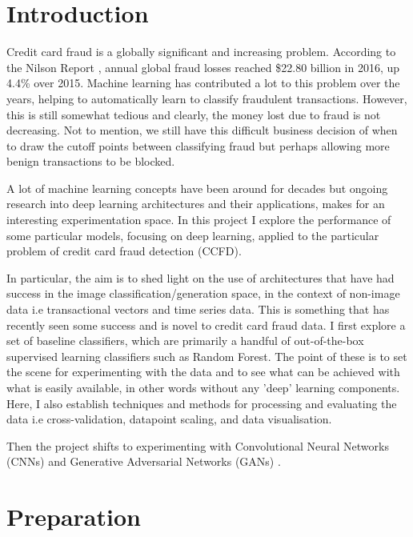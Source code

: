 \documentclass[12pt,a4paper,twoside]{report}
\begin{document}
\tableofcontents

\pagestyle{headings} 

\chapter{Introduction}

Credit card fraud is a globally significant and increasing problem. According to the Nilson Report \cite{nilsonreport}, annual global fraud losses reached \$22.80 billion in 2016, up 4.4\% over 2015. Machine learning has contributed a lot to this problem over the years, helping to automatically learn to classify fraudulent transactions. However, this is still somewhat tedious and clearly, the money lost due to fraud is not decreasing. Not to mention, we still have this difficult business decision of when to draw the cutoff points between classifying fraud but perhaps allowing more benign transactions to be blocked.

A lot of machine learning concepts have been around for decades but ongoing research into deep learning architectures and their applications, makes for an interesting experimentation space. In this project I explore the performance of some particular models, focusing on deep learning, applied to the particular problem of credit card fraud detection (CCFD).

In particular, the aim is to shed light on the use of architectures that have had success in the image classification/generation space, in the context of non-image data i.e transactional vectors and time series data.
This is something that has recently seen some success \cite{wang2017time} and is novel to credit card fraud data. 
I first explore a set of baseline classifiers, which are primarily a handful of out-of-the-box supervised learning classifiers such as Random Forest. The point of these is to set the scene for experimenting with the data and to see what can be achieved with what is easily available, in other words without any 'deep' learning components. Here, I also establish techniques and methods for processing and evaluating the data i.e cross-validation, datapoint scaling, and data visualisation. 

Then the project shifts to experimenting with Convolutional Neural Networks (CNNs) \cite{DBLP:journals/corr/SimonyanZ14a} and Generative Adversarial Networks (GANs) \cite{2014arXiv1406.2661G}.  

\chapter{Preparation} \label{preparation}
\end{document}
